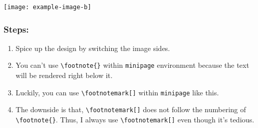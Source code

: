 \begin{minipage}{.45\textwidth}
    \centering
    \texttt{[image: example-image-b]}
    \label{fig:4.2}
\end{minipage}
\hspace{.05\textwidth}
\begin{minipage}{0.45\textwidth}
\begin{rightbox}
    \subsubsection*{Steps:}
    \begin{enumerate}
        \item Spice up the design by switching the image sides.
        \item You can't use \verb|\footnote{}| within \verb|minipage| environment because the text will be rendered right below it.
        \item Luckily, you can use \verb|\footnotemark[]| within \verb|minipage| like this.\footnotemark[2]
        \item The downside is that, \verb|\footnotemark[]| does not follow the numbering of \verb|\footnote{}|. Thus, I always use \verb|\footnotemark[]| even though it's tedious.
    \end{enumerate} 
\end{rightbox}
\end{minipage} 


\newpage

